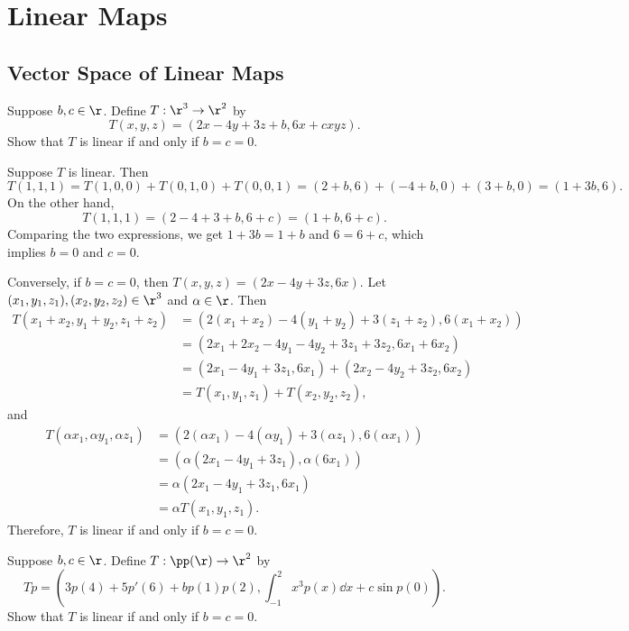 \section{Linear Maps}

\subsection{Vector Space of Linear Maps}

\begin{exercise}[3a1]
    Suppose $b, c \in \r$. Define $T: \r^3 \to \r^2$ by
    \[T(x, y, z) = (2x - 4y + 3z + b, 6x + cxyz).\]
    Show that $T$ is linear if and only if $b = c = 0$.
\end{exercise}

\begin{sol}
    Suppose $T$ is linear. Then
    \[T(1, 1, 1) = T(1, 0, 0) + T(0, 1, 0) + T(0, 0, 1) = (2 + b, 6) + (-4 + b, 0) + (3 + b, 0) = (1 + 3b, 6).\]
    On the other hand,
    \[T(1, 1, 1) = (2 - 4 + 3 + b, 6 + c) = (1 + b, 6 + c).\]
    Comparing the two expressions, we get $1 + 3b = 1 + b$ and $6 = 6 + c$, which implies $b = 0$ and $c = 0$.

    Conversely, if $b = c = 0$, then $T(x, y, z) = (2x - 4y + 3z, 6x)$. Let $(x_1, y_1, z_1), (x_2, y_2, z_2) \in \r^3$ and $\alpha \in \r$. Then
    \begin{align*}
        T(x_1 + x_2, y_1 + y_2, z_1 + z_2) & = (2(x_1 + x_2) - 4(y_1 + y_2) + 3(z_1 + z_2), 6(x_1 + x_2)) \\
        & = (2x_1 + 2x_2 - 4y_1 - 4y_2 + 3z_1 + 3z_2, 6x_1 + 6x_2) \\
        & = (2x_1 - 4y_1 + 3z_1, 6x_1) + (2x_2 - 4y_2 + 3z_2, 6x_2) \\
        & = T(x_1, y_1, z_1) + T(x_2, y_2, z_2),
    \end{align*}
    and
    \begin{align*}
        T(\alpha x_1, \alpha y_1, \alpha z_1) & = (2(\alpha x_1) - 4(\alpha y_1) + 3(\alpha z_1), 6(\alpha x_1)) \\
        & = (\alpha(2x_1 - 4y_1 + 3z_1), \alpha(6x_1)) \\
        & = \alpha(2x_1 - 4y_1 + 3z_1, 6x_1) \\
        & = \alpha T(x_1, y_1, z_1).
    \end{align*}
    Therefore, $T$ is linear if and only if $b = c = 0$.
\end{sol}

\begin{exercise}[3a2]
    Suppose $b, c \in \r$. Define $T: \pp(\r) \to \r^2$ by
    \[Tp = \left(3p(4) + 5p'(6) + bp(1)p(2), \int_{-1}^{2} x^3 p(x) \dd x + c \sin p(0)\right).\]
    Show that $T$ is linear if and only if $b = c = 0$.
\end{exercise}

